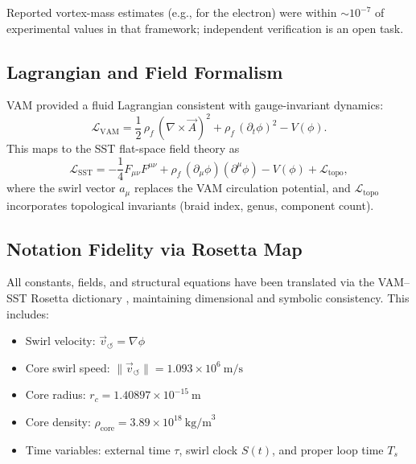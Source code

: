 \documentclass[11pt]{article}
\newcommand{\rhof}{\rho_{\!f}}                           %
\begin{document}
        Reported vortex-mass estimates (e.g., for the electron) were within $\sim 10^{-7}$ of experimental values in that framework; independent verification is an open task.

    \subsection{Lagrangian and Field Formalism}

        VAM provided a fluid Lagrangian consistent with gauge-invariant dynamics:
        \begin{equation}
            \mathcal{L}_\text{VAM} = \frac{1}{2} \, \rhof \, (\nabla \times \vec{A})^2 + \rhof \, (\partial_t \phi)^2 - V(\phi).
        \end{equation}
        This maps to the SST flat-space field theory as
        \begin{equation}
            \mathcal{L}_\text{SST} = -\frac{1}{4} F_{\mu\nu} F^{\mu\nu} + \rhof \, (\partial_\mu \phi)(\partial^\mu \phi) - V(\phi) + \mathcal{L}_{\text{topo}},
        \end{equation}
        where the swirl vector $a_\mu$ replaces the VAM circulation potential, and $\mathcal{L}_{\text{topo}}$ incorporates topological invariants (braid index, genus, component count).

    \subsection{Notation Fidelity via Rosetta Map}

        All constants, fields, and structural equations have been translated via the VAM–SST Rosetta dictionary \cite{vamrosetta2025}, maintaining dimensional and symbolic consistency. This includes:
        \begin{itemize}
            \item Swirl velocity: $ \vec{v}_{\circlearrowleft} = \nabla \phi $
            \item Core swirl speed: $ \|\vec{v}_{\circlearrowleft}\| = 1.093 \times 10^6\ \text{m/s} $
            \item Core radius: $ r_c = 1.40897 \times 10^{-15}\ \text{m} $
            \item Core density: $ \rho_{\text{core}} = 3.89 \times 10^{18}\ \text{kg/m}^3 $
            \item Time variables: external time $ \tau$, swirl clock $ S(t)$, and proper loop time $ T_s $
        \end{itemize}
\end{document}
